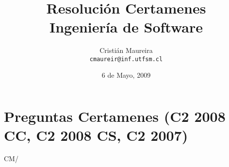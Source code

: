 \documentclass[spanish]{article}
\author{
Cristián Maureira  \\
\texttt{cmaureir@inf.utfsm.cl}
}
\title{Resolución Certamenes\\
       Ingeniería de Software}
\date{6 de Mayo, 2009}
\begin{document}
\maketitle\thispagestyle{empty}

\section{Preguntas Certamenes (C2 2008 CC, C2 2008 CS, C2 2007)}




\vspace*{\fill}\hspace{\fill}CM/\LaTeXe
\end{document}
